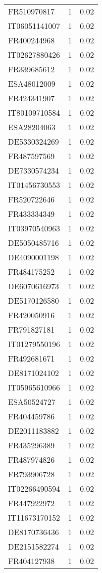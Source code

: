 \begin{table*}[htbp]
\begin{tabular}{lrr}
FR510970817 & 1 & 0.02 \\
IT06051141007 & 1 & 0.02 \\
FR400244968 & 1 & 0.02 \\
IT02627880426 & 1 & 0.02 \\
FR339685612 & 1 & 0.02 \\
ESA48012009 & 1 & 0.02 \\
FR424341907 & 1 & 0.02 \\
IT80109710584 & 1 & 0.02 \\
ESA28204063 & 1 & 0.02 \\
DE5330324269 & 1 & 0.02 \\
FR487597569 & 1 & 0.02 \\
DE7330574234 & 1 & 0.02 \\
IT01456730553 & 1 & 0.02 \\
FR520722646 & 1 & 0.02 \\
FR433334349 & 1 & 0.02 \\
IT03970540963 & 1 & 0.02 \\
DE5050485716 & 1 & 0.02 \\
DE4090001198 & 1 & 0.02 \\
FR484175252 & 1 & 0.02 \\
DE6070616973 & 1 & 0.02 \\
DE5170126580 & 1 & 0.02 \\
FR420050916 & 1 & 0.02 \\
FR791827181 & 1 & 0.02 \\
IT01279550196 & 1 & 0.02 \\
FR492681671 & 1 & 0.02 \\
DE8171024102 & 1 & 0.02 \\
IT05965610966 & 1 & 0.02 \\
ESA50524727 & 1 & 0.02 \\
FR404459786 & 1 & 0.02 \\
DE2011183882 & 1 & 0.02 \\
FR435296389 & 1 & 0.02 \\
FR487974826 & 1 & 0.02 \\
FR793906728 & 1 & 0.02 \\
IT02266490594 & 1 & 0.02 \\
FR447922972 & 1 & 0.02 \\
IT11673170152 & 1 & 0.02 \\
DE8170736436 & 1 & 0.02 \\
DE2151582274 & 1 & 0.02 \\
FR404127938 & 1 & 0.02 \\

\end{tabular}
\end{table*}
